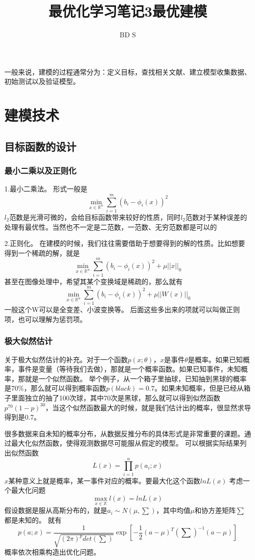 \documentclass{article}
\title{最优化学习笔记3最优建模}
\author{BD S}
\begin{document}
\maketitle
\tableofcontents
\newpage

一般来说，建模的过程通常分为：定义目标，查找相关文献、建立模型收集数据、初始测试以及验证模型。
\section{建模技术}
\subsection{目标函数的设计}
\subsubsection{最小二乘以及正则化}
1.最小二乘法。
形式一般是
$$
\min\limits_{x \in \mathbb{R}^n} \sum\limits_{i=1}^m (b_i-\phi_i(x))^2
$$
$l_2$范数是光滑可微的，会给目标函数带来较好的性质，同时$l_2$范数对于某种误差的处理有最优性。当然也不一定是二范数，一范数、无穷范数都是可以的

2.正则化。
在建模的时候，我们往往需要借助于想要得到的解的性质。比如想要得到一个稀疏的解，就是
$$
\min\limits_{x \in \mathbb{R}^n} \sum\limits_{i=1}^m (b_i-\phi_i(x))^2+\mu||x||_0
$$
甚至在图像处理中，希望其某个变换域是稀疏的，那么就有
$$
\min\limits_{x \in \mathbb{R}^n} \sum\limits_{i=1}^m (b_i-\phi_i(x))^2+\mu||W(x)||_0
$$
一般这个W可以是全变差、小波变换等。
后面这些多出来的项就可以叫做正则项，也可以理解为惩罚项。
\subsubsection{极大似然估计}
关于极大似然估计的补充。对于一个函数$p(x;\theta)$，$x$是事件$\theta$是概率。如果已知概率，事件是变量（等待我们去做），那就是一个概率函数。如果已知事件，未知概率，那就是一个似然函数。
举个例子，从一个箱子里抽球，已知抽到黑球的概率是70\%，那么就可以得到概率函数$p(black)=0.7$。如果未知概率，但是已经从箱子里面独立的抽了100次球，其中70次是黑球，那么就可以得到似然函数$p^{70}(1-p)^{30}$，当这个似然函数最大的时候，就是我们估计出的概率，很显然求导得到是0.7。

很多数据来自未知的概率分布，从数据反推分布的具体形式是非常重要的课题。通过最大化似然函数，使得观测数据尽可能服从假定的模型。
可以根据实际结果列出似然函数
$$
L(x)=\prod_{i=1}^n p(a_i;x)
$$
$x$某种意义上就是概率，某一事件对应的概率。要最大化这个函数$lnL(x)$
考虑一个最大化问题
$$\max\limits_{x \in \mathbb{X}} l(x)=lnL(x)$$
假设数据是服从高斯分布的，就是$a_i\sim N(\mu,\sum)$，其中均值$\mu$和协方差矩阵$\sum$都是未知的。
就有$$
p(a;x)=\frac{1}{\sqrt{(2\pi)^p det(\sum)}}\exp[-\frac{1}{2}(a-\mu)^T(\sum)^{-1}(a-\mu)]
$$
概率依次相乘构造出优化问题。
\end{document}
